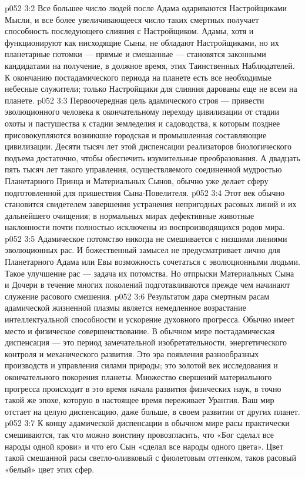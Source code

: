 \vs p052 3:2 Все большее число людей после Адама одариваются Настройщиками Мысли, и все более увеличивающееся число таких смертных получает способность последующего слияния с Настройщиком. Адамы, хотя и функционируют как нисходящие Сыны, не обладают Настройщиками, но их планетарные потомки --- прямые и смешанные --- становятся законными кандидатами на получение, в должное время, этих Таинственных Наблюдателей. К окончанию постадамического периода на планете есть все необходимые небесные служители; только Настройщики для слияния дарованы еще не всем на планете.
\vs p052 3:3 \pc Первоочередная цель адамического строя --- привести эволюционного человека к окончательному переходу цивилизации от стадии охоты и пастушества к стадии земледелия и садоводства, к которым позднее присовокупляются возникшие городская и промышленная составляющие цивилизации. Десяти тысяч лет этой диспенсации реализаторов биологического подъема достаточно, чтобы обеспечить изумительные преобразования. А двадцать пять тысяч лет такого управления, осуществляемого соединенной мудростью Планетарного Принца и Материальных Сынов, обычно уже делает сферу подготовленной для пришествия Сына\hyp{}Повелителя.
\vs p052 3:4 \pc Этот век обычно становится свидетелем завершения устранения непригодных расовых линий и их дальнейшего очищения; в нормальных мирах дефективные животные наклонности почти полностью исключены из воспроизводящихся родов мира.
\vs p052 3:5 Адамическое потомство никогда не смешивается с низшими линиями эволюционных рас. И божественный замысел не предусматривает лично для Планетарного Адама или Евы возможность сочетаться с эволюционными людьми. Такое улучшение рас --- задача их потомства. Но отпрыски Материальных Сына и Дочери в течение многих поколений подготавливаются прежде чем начинают служение расового смешения.
\vs p052 3:6 Результатом дара смертным расам адамической жизненной плазмы является немедленное возрастание интеллектуальной способности и ускорение духовного прогресса. Обычно имеет место и физическое совершенствование. В обычном мире постадамическая диспенсация --- это период замечательной изобретательности, энергетического контроля и механического развития. Это эра появления разнообразных производств и управления силами природы; это золотой век исследования и окончательного покорения планеты. Множество свершений материального прогресса происходит в это время начала развития физических наук, в точно такой же эпохе, которую в настоящее время переживает Урантия. Ваш мир отстает на целую диспенсацию, даже больше, в своем развитии от других планет.
\vs p052 3:7 К концу адамической диспенсации в обычном мире расы практически смешиваются, так что можно воистину провозгласить, что «Бог сделал все народы одной крови» и что его Сын «сделал все народы одного цвета». Цвет такой смешанной расы светло\hyp{}оливковый с фиолетовым оттенком, таков расовый «белый» цвет этих сфер.
